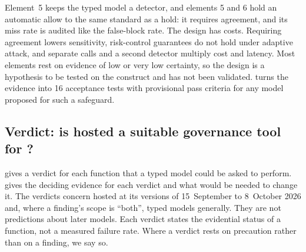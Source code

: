 Element~5 keeps the typed model a detector, and elements 5 and 6 hold an automatic allow to the same standard as a hold: it requires agreement, and its miss rate is audited like the false-block rate.
The design has costs. Requiring agreement lowers sensitivity, risk-control guarantees do not hold under adaptive attack, and separate calls and a second detector multiply cost and latency.
Most elements rest on evidence of low or very low certainty, so the design is a hypothesis to be tested on the \pol{} construct and has not been validated.
 turns the evidence into 16 acceptance tests with provisional pass criteria for any model proposed for such a safeguard.

\subsection{Verdict: is hosted \texorpdfstring{\jev{}}{Jev} a suitable governance tool for \pol{}?}
\label{sec:verdict}

 gives a verdict for each \pol{} function that a typed model could be asked to perform.
 gives the deciding evidence for each verdict and what would be needed to change it.
The verdicts concern hosted \jev{} at its versions of 15~September to 8~October 2026 and, where a finding's scope is ``both'', typed models generally.
They are not predictions about later models.
Each verdict states the evidential status of a function, not a measured failure rate. Where a verdict rests on precaution rather than on a finding, we say so.

